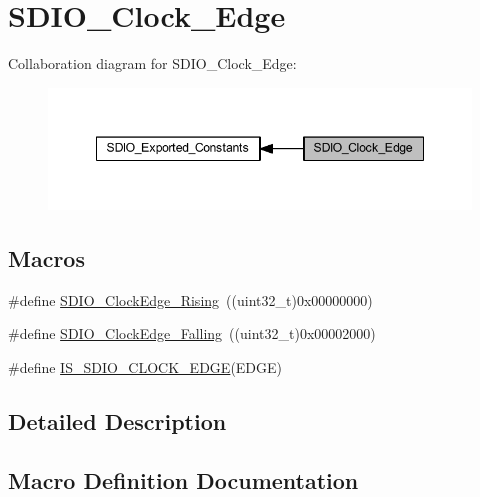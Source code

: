 \hypertarget{group___s_d_i_o___clock___edge}{}\section{S\+D\+I\+O\+\_\+\+Clock\+\_\+\+Edge}
\label{group___s_d_i_o___clock___edge}
Collaboration diagram for S\+D\+I\+O\+\_\+\+Clock\+\_\+\+Edge\+:
\nopagebreak
\begin{figure}[H]
\begin{center}
\leavevmode
\includegraphics[width=348pt]{group___s_d_i_o___clock___edge}
\end{center}
\end{figure}
\subsection*{Macros}
\begin{DoxyCompactItemize}
\item 
\#define \hyperlink{group___s_d_i_o___clock___edge_ga6d0f902037762a3048d95303c0037313}{S\+D\+I\+O\+\_\+\+Clock\+Edge\+\_\+\+Rising}~((uint32\+\_\+t)0x00000000)
\item 
\#define \hyperlink{group___s_d_i_o___clock___edge_ga7be68024e3e2fe1994def85bc944189b}{S\+D\+I\+O\+\_\+\+Clock\+Edge\+\_\+\+Falling}~((uint32\+\_\+t)0x00002000)
\item 
\#define \hyperlink{group___s_d_i_o___clock___edge_ga63420b10a52e3d82a89a45f20dc41786}{I\+S\+\_\+\+S\+D\+I\+O\+\_\+\+C\+L\+O\+C\+K\+\_\+\+E\+D\+GE}(E\+D\+GE)
\end{DoxyCompactItemize}


\subsection{Detailed Description}


\subsection{Macro Definition Documentation}
\mbox{\label{group___s_d_i_o___clock___edge_ga63420b10a52e3d82a89a45f20dc41786}} 
